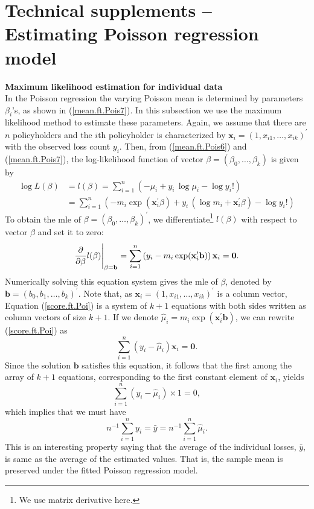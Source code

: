 \documentclass[12pt]{article}
\begin{document}
\section{Technical supplements -- Estimating Poisson regression model}\label{mle.Pois.reg}
\noindent\textbf{Maximum likelihood estimation for individual data\\}
In the Poisson regression the varying Poisson mean is determined by parameters $\beta_i$'s, as shown in (\ref{mean.ft.Pois7}). In this subsection we use the maximum likelihood method to estimate these parameters. Again, we assume that there are $n$ policyholders and the $i$th policyholder is characterized by $\mathbf{ x}_i=(1, x_{i1}, \ldots, x_{ik})^{\prime}$ with the observed loss count $y_i$. Then, from (\ref{mean.ft.Pois6}) and (\ref{mean.ft.Pois7}), the log-likelihood function of vector $\beta=(\beta_0, \dots, \beta_k)$ is given by
\begin{align}
\label{ll.Poi.reg}
\nonumber \log L(\beta)    &= l(\beta)=\sum^n_{i=1} \left( -\mu_i +y_i \, \log \mu_i -\log y_i! \right)  \\
    &  = \sum^n_{i=1} \left( -m_i \exp(\mathbf{ x}^{\prime}_i\beta) +y_i \,(\log m_i+\mathbf{ x}^{\prime}_i\beta)  -\log y_i! \right)  
\end{align}
To obtain the mle of $\beta=(\beta_0, \ldots, \beta_k)^{\prime}$, we differentiate\footnote{We use matrix derivative here.} $l(\beta)$ with respect to vector $\beta$ and set it to zero:
\begin{equation}
\label{score.ft.Poi}
\frac{\partial}{\partial \beta}l(\beta)\Bigg{|}_{\beta=\mathbf{ b}}=\sum^n_{i=1} \left(y_i -m_i \exp(\mathbf{ x}^{\prime}_i \mathbf{ b}) \right)\mathbf{ x}_i=\mathbf{ 0}.
\end{equation} 
Numerically solving this equation system gives the mle of $\beta$, denoted by $\mathbf{ b}=(b_0, b_1, \ldots, b_k)^{\prime}$.
Note that, as $\mathbf{ x}_i=(1, x_{i1}, \ldots, x_{ik})^{\prime}$ is a column vector, Equation (\ref{score.ft.Poi}) is a system of $k+1$ equations with both sides written as column vectors of size $k+1$. If we denote $\hat{\mu}_i=m_i \exp(\mathbf{ x}^{\prime}_i \mathbf{ b})$, we can rewrite (\ref{score.ft.Poi}) as
\begin{equation}
\label{score.ft.Poi.2}\nonumber
\sum^n_{i=1} \left(y_i -\hat{\mu}_i \right)\mathbf{ x}_i=\mathbf{ 0}.
\end{equation}
Since the solution $\mathbf{ b}$ satisfies this equation, it follows that the first among the array of $k+1$ equations, corresponding to the first constant element of $\mathbf{ x}_i$, yields 
\begin{equation}
\label{ }\nonumber
\sum^n_{i=1}\left( y_i -\hat{\mu}_i \right)\times 1={ 0},
\end{equation} which implies that we must have
\begin{equation}
\label{ }\nonumber
n^{-1}\sum_{i=1}^n y_i =\bar{y}=n^{-1}\sum_{i=1}^n \hat{\mu}_i.
\end{equation} 
This is an interesting property saying that the average of the individual losses, $\bar{y}$, is same as the average of the estimated values. That is, the sample mean is preserved under the fitted Poisson regression model.\\
\end{document}
